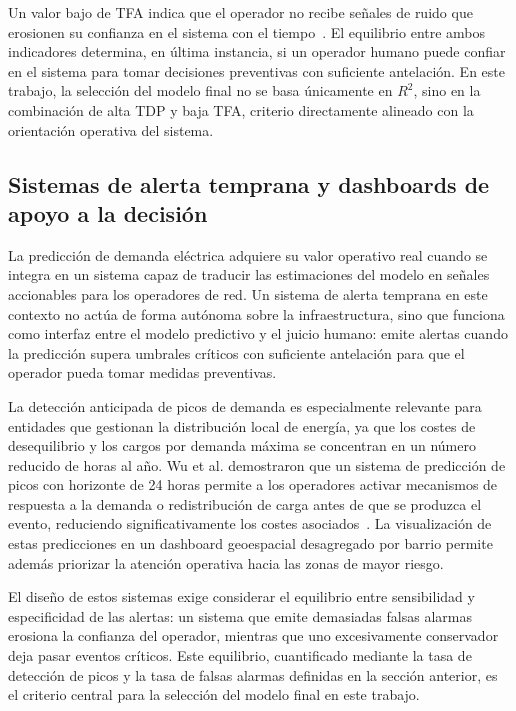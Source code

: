 \documentclass[12pt, a4paper]{article}
\begin{document}
Un valor bajo de TFA indica que el operador no recibe señales de ruido que erosionen su confianza en el sistema con el tiempo~\cite{maridelolmo2022, yasuhiro2020}. El equilibrio entre ambos indicadores determina, en última instancia, si un operador humano puede confiar en el sistema para tomar decisiones preventivas con suficiente antelación. En este trabajo, la selección del modelo final no se basa únicamente en $R^2$, sino en la combinación de alta TDP y baja TFA, criterio directamente alineado con la orientación operativa del sistema.

\subsection{Sistemas de alerta temprana y dashboards de apoyo a la decisión}


La predicción de demanda eléctrica adquiere su valor operativo real cuando se integra en un sistema capaz de traducir las estimaciones del modelo en señales accionables para los operadores de red. Un sistema de alerta temprana en este contexto no actúa de forma autónoma sobre la infraestructura, sino que funciona como interfaz entre el modelo predictivo y el juicio humano: emite alertas cuando la predicción supera umbrales críticos con suficiente antelación para que el operador pueda tomar medidas preventivas.

La detección anticipada de picos de demanda es especialmente relevante para entidades que gestionan la distribución local de energía, ya que los costes de desequilibrio y los cargos por demanda máxima se concentran en un número reducido de horas al año. Wu et al. demostraron que un sistema de predicción de picos con horizonte de 24 horas permite a los operadores activar mecanismos de respuesta a la demanda o redistribución de carga antes de que se produzca el evento, reduciendo significativamente los costes asociados~\cite{wu2022}. La visualización de estas predicciones en un dashboard geoespacial desagregado por barrio permite además priorizar la atención operativa hacia las zonas de mayor riesgo.

El diseño de estos sistemas exige considerar el equilibrio entre sensibilidad y especificidad de las alertas: un sistema que emite demasiadas falsas alarmas erosiona la confianza del operador, mientras que uno excesivamente conservador deja pasar eventos críticos. Este equilibrio, cuantificado mediante la tasa de detección de picos y la tasa de falsas alarmas definidas en la sección anterior, es el criterio central para la selección del modelo final en este trabajo.
\end{document}
